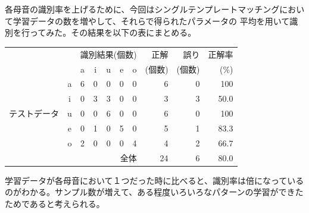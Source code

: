 \documentclass[10pt]{jsarticle}
\begin{document}
\section{}
各母音の識別率を上げるために、今回はシングルテンプレートマッチングにおいて学習データの数を増やして、それらで得られたパラメータの
平均を用いて識別を行ってみた。その結果を以下の表にまとめる。
\begin{table}[h]
\centering
\begin{tabular}{|cc||ccccc|rrr|} \hline
\multicolumn{2}{|c||}{} 	& \multicolumn{5}{c|}{識別結果(個数)}	& 正解	& 誤り		& 正解率\\
\multicolumn{2}{|c||}{} 	& a & i & u & e & o 			& (個数) 	& (個数) 	& (\%) \\ \hline \hline
	 	& a 	    	& 6 & 0 & 0 & 0 & 0 			& 6 		& 0 		& 100\\
		& i 		& 0 & 3 & 3 & 0 & 0 			& 3 		& 3 		& 50.0\\
テストデータ 	& u 		& 0 & 0 & 6 & 0 & 0 			& 6 		& 0 		& 100\\
	 	& e 		& 0 & 1 & 0 & 5 & 0 			& 5 		& 1 		& 83.3\\
	 	& o 		& 2 & 0 & 0 & 0 & 4 			& 4 		& 2 		& 66.7\\ \hline \hline
\multicolumn{7}{|r|}{全体} 						& 24		& 6		& 80.0\\ \hline
\end{tabular}
\end{table}
学習データが各母音において１つだった時に比べると、識別率は倍になっているのがわかる。サンプル数が増えて、ある程度いろいろなパターンの学習ができたためであると考えられる。
\end{document}
